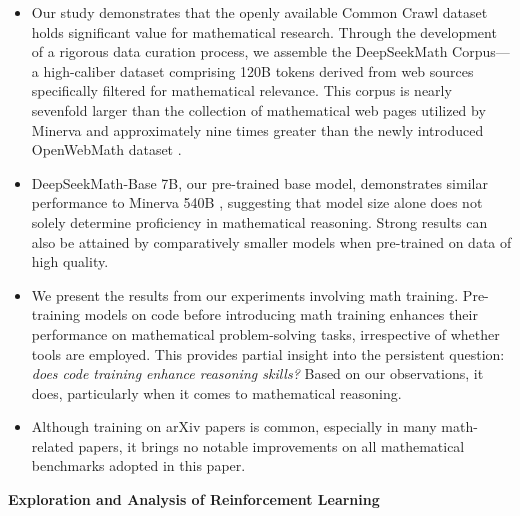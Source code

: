 \begin{itemize}[topsep=0pt]
    \item Our study demonstrates that the openly available Common Crawl dataset holds significant value for mathematical research. Through the development of a rigorous data curation process, we assemble the DeepSeekMath Corpus—a high-caliber dataset comprising 120B tokens derived from web sources specifically filtered for mathematical relevance. This corpus is nearly sevenfold larger than the collection of mathematical web pages utilized by Minerva \citep{minerva} and approximately nine times greater than the newly introduced OpenWebMath dataset \citep{openwebmath}.

\item DeepSeekMath-Base 7B, our pre-trained base model, demonstrates similar performance to Minerva 540B \citep{minerva}, suggesting that model size alone does not solely determine proficiency in mathematical reasoning. Strong results can also be attained by comparatively smaller models when pre-trained on data of high quality.

\item We present the results from our experiments involving math training. Pre-training models on code before introducing math training enhances their performance on mathematical problem-solving tasks, irrespective of whether tools are employed. This provides partial insight into the persistent question: \textit{does code training enhance reasoning skills?} Based on our observations, it does, particularly when it comes to mathematical reasoning.

    \item Although training on arXiv papers is common, especially in many math-related papers, it brings no notable improvements on all mathematical benchmarks adopted in this paper.
\end{itemize}

\textbf{Exploration and Analysis of Reinforcement Learning}

